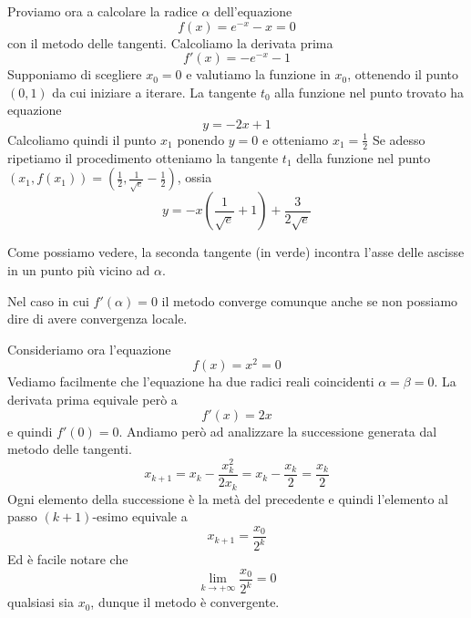 \begin{example}
	Proviamo ora a calcolare la radice $\alpha$ dell'equazione
	\[ f(x) = e^{-x} - x = 0 \]
	con il metodo delle tangenti. Calcoliamo la derivata prima
	\[ f'(x) = -e^{-x} - 1 \]
	Supponiamo di scegliere $x_0 = 0$ e valutiamo la funzione in $x_0$, ottenendo il punto $(0, 1)$ da cui
	iniziare a iterare. La tangente $t_0$ alla funzione nel punto trovato ha equazione
	\[ y = -2x + 1 \]
	Calcoliamo quindi il punto $x_1$ ponendo $y=0$ e otteniamo $x_1 = \frac{1}{2}$
	Se adesso ripetiamo il procedimento otteniamo la tangente $t_1$ della funzione nel punto
	$(x_1, f(x_1)) = \left( \frac{1}{2}, \frac{1}{\sqrt{e}} - \frac{1}{2} \right)$, ossia
	\[ y = - x \left( \frac{1}{\sqrt{e}} + 1 \right) + \frac{3}{2 \sqrt{e}} \]
	\begin{center}
	\end{center}
	Come possiamo vedere, la seconda tangente (in verde) incontra l'asse delle ascisse in un punto più vicino ad
	$\alpha$.
\end{example}

Nel caso in cui $f'(\alpha) = 0$ il metodo converge comunque anche se non possiamo dire di avere convergenza
locale.

\begin{example}
	Consideriamo ora l'equazione
	\[ f(x) = x^2 = 0 \]
	Vediamo facilmente che l'equazione ha due radici reali coincidenti $\alpha = \beta = 0$. La derivata prima
	equivale però a
	\[ f'(x) = 2x \]
	e quindi $f'(0) = 0$. Andiamo però ad analizzare la successione generata dal metodo delle tangenti.
	\[ x_{k+1} = x_k - \frac{x_k^2}{2 x_k} = x_k - \frac{x_k}{2} = \frac{x_k}{2} \]
	Ogni elemento della successione è la metà del precedente e quindi l'elemento al passo $(k+1)$-esimo equivale a
	\[ x_{k+1} = \frac{x_0}{2^k} \]
	Ed è facile notare che
	\[ \lim_{k \to +\infty} \frac{x_0}{2^k} = 0 \]
	qualsiasi sia $x_0$, dunque il metodo è convergente.
\end{example}

